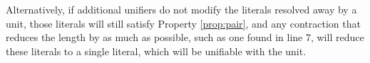 Alternatively, if additional unifiers do not modify the literals resolved away by a unit, those literals will still satisfy Property \ref{prop:pair}, and any contraction that reduces the length by as much as possible, such as one found in line 7, will reduce these literals to a single literal, which will be unifiable with the unit. 



%


